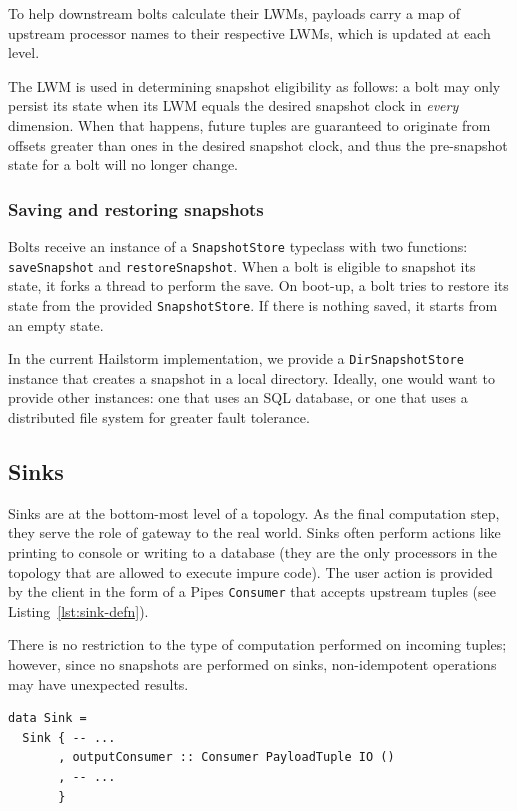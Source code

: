 \documentclass[10pt,nocopyrightspace]{sigplanconf}
\begin{document}
To help downstream bolts calculate their LWMs, payloads carry a map
of upstream processor names to their respective LWMs, which is updated at each
level.

The LWM is used in determining snapshot eligibility as follows: a bolt may only
persist its state when its LWM equals the desired snapshot clock in
\emph{every} dimension. When that happens, future tuples are guaranteed to
originate from offsets greater than ones in the desired snapshot clock, and
thus the pre-snapshot state for a bolt will no longer change.

\subsubsection{Saving and restoring snapshots}
\label{sec:snapshot}

Bolts receive an instance of a \lstinline{SnapshotStore} typeclass with two
functions: \lstinline{saveSnapshot} and \lstinline{restoreSnapshot}. When a
bolt is eligible to snapshot its state, it forks a thread to perform the save.
On boot-up, a bolt tries to restore its state from the provided
\lstinline{SnapshotStore}. If there is nothing saved, it starts from an empty
state.

In the current Hailstorm implementation, we provide a
\lstinline{DirSnapshotStore} instance that creates a snapshot in a local
directory. Ideally, one would want to provide other instances: one that uses an
SQL database, or one that uses a distributed file system for greater fault
tolerance.

\subsection{Sinks}

Sinks are at the bottom-most level of a topology. As the final computation
step, they serve the role of gateway to the real world. Sinks often perform
actions like printing to console or writing to a database (they are the only
processors in the topology that are allowed to execute impure code). The user
action is provided by the client in the form of a Pipes \lstinline{Consumer}
that accepts upstream tuples (see Listing~\ref{lst:sink-defn}).

There is no restriction to the type of computation performed on incoming
tuples; however, since no snapshots are performed on sinks, non-idempotent
operations may have unexpected results.

\begin{lstlisting}[caption=Client interface for a
sink,label=lst:sink-defn,float]
data Sink =
  Sink { -- ...
       , outputConsumer :: Consumer PayloadTuple IO ()
       , -- ...
       }
\end{lstlisting}
\end{document}
